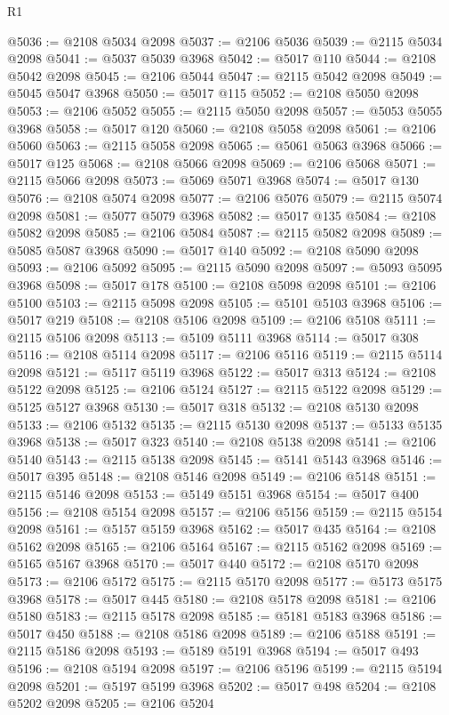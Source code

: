 \begin{lexlean}{R1}
\begin{coremodule}
@5036 := @2108 @5034 @2098
@5037 := @2106 @5036
@5039 := @2115 @5034 @2098
@5041 := @5037 @5039 @3968
@5042 := @5017 @110
@5044 := @2108 @5042 @2098
@5045 := @2106 @5044
@5047 := @2115 @5042 @2098
@5049 := @5045 @5047 @3968
@5050 := @5017 @115
@5052 := @2108 @5050 @2098
@5053 := @2106 @5052
@5055 := @2115 @5050 @2098
@5057 := @5053 @5055 @3968
@5058 := @5017 @120
@5060 := @2108 @5058 @2098
@5061 := @2106 @5060
@5063 := @2115 @5058 @2098
@5065 := @5061 @5063 @3968
@5066 := @5017 @125
@5068 := @2108 @5066 @2098
@5069 := @2106 @5068
@5071 := @2115 @5066 @2098
@5073 := @5069 @5071 @3968
@5074 := @5017 @130
@5076 := @2108 @5074 @2098
@5077 := @2106 @5076
@5079 := @2115 @5074 @2098
@5081 := @5077 @5079 @3968
@5082 := @5017 @135
@5084 := @2108 @5082 @2098
@5085 := @2106 @5084
@5087 := @2115 @5082 @2098
@5089 := @5085 @5087 @3968
@5090 := @5017 @140
@5092 := @2108 @5090 @2098
@5093 := @2106 @5092
@5095 := @2115 @5090 @2098
@5097 := @5093 @5095 @3968
@5098 := @5017 @178
@5100 := @2108 @5098 @2098
@5101 := @2106 @5100
@5103 := @2115 @5098 @2098
@5105 := @5101 @5103 @3968
@5106 := @5017 @219
@5108 := @2108 @5106 @2098
@5109 := @2106 @5108
@5111 := @2115 @5106 @2098
@5113 := @5109 @5111 @3968
@5114 := @5017 @308
@5116 := @2108 @5114 @2098
@5117 := @2106 @5116
@5119 := @2115 @5114 @2098
@5121 := @5117 @5119 @3968
@5122 := @5017 @313
@5124 := @2108 @5122 @2098
@5125 := @2106 @5124
@5127 := @2115 @5122 @2098
@5129 := @5125 @5127 @3968
@5130 := @5017 @318
@5132 := @2108 @5130 @2098
@5133 := @2106 @5132
@5135 := @2115 @5130 @2098
@5137 := @5133 @5135 @3968
@5138 := @5017 @323
@5140 := @2108 @5138 @2098
@5141 := @2106 @5140
@5143 := @2115 @5138 @2098
@5145 := @5141 @5143 @3968
@5146 := @5017 @395
@5148 := @2108 @5146 @2098
@5149 := @2106 @5148
@5151 := @2115 @5146 @2098
@5153 := @5149 @5151 @3968
@5154 := @5017 @400
@5156 := @2108 @5154 @2098
@5157 := @2106 @5156
@5159 := @2115 @5154 @2098
@5161 := @5157 @5159 @3968
@5162 := @5017 @435
@5164 := @2108 @5162 @2098
@5165 := @2106 @5164
@5167 := @2115 @5162 @2098
@5169 := @5165 @5167 @3968
@5170 := @5017 @440
@5172 := @2108 @5170 @2098
@5173 := @2106 @5172
@5175 := @2115 @5170 @2098
@5177 := @5173 @5175 @3968
@5178 := @5017 @445
@5180 := @2108 @5178 @2098
@5181 := @2106 @5180
@5183 := @2115 @5178 @2098
@5185 := @5181 @5183 @3968
@5186 := @5017 @450
@5188 := @2108 @5186 @2098
@5189 := @2106 @5188
@5191 := @2115 @5186 @2098
@5193 := @5189 @5191 @3968
@5194 := @5017 @493
@5196 := @2108 @5194 @2098
@5197 := @2106 @5196
@5199 := @2115 @5194 @2098
@5201 := @5197 @5199 @3968
@5202 := @5017 @498
@5204 := @2108 @5202 @2098
@5205 := @2106 @5204

\end{coremodule}
\end{lexlean}
